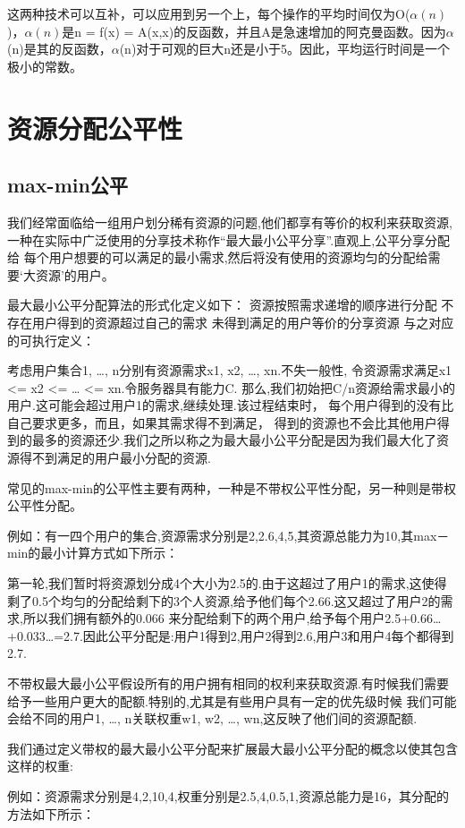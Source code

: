 这两种技术可以互补，可以应用到另一个上，每个操作的平均时间仅为O($\alpha(n)$)，$\alpha(n)$是n = f(x) = A(x,x)的反函数，并且A是急速增加的阿克曼函数。因为$\alpha$(n)是其的反函数，$\alpha$(n)对于可观的巨大n还是小于5。因此，平均运行时间是一个极小的常数。

\section{资源分配公平性}
\subsection{max-min公平}
我们经常面临给一组用户划分稀有资源的问题,他们都享有等价的权利来获取资源,
一种在实际中广泛使用的分享技术称作“最大最小公平分享”.直观上,公平分享分配给
每个用户想要的可以满足的最小需求,然后将没有使用的资源均匀的分配给需要‘大资源’的用户。

最大最小公平分配算法的形式化定义如下：
资源按照需求递增的顺序进行分配
不存在用户得到的资源超过自己的需求
未得到满足的用户等价的分享资源
与之对应的可执行定义：

考虑用户集合1, …, n分别有资源需求x1, x2, …, xn.不失一般性,
令资源需求满足x1 <= x2 <= … <= xn.令服务器具有能力C.
那么,我们初始把C/n资源给需求最小的用户.这可能会超过用户1的需求,继续处理.该过程结束时，
每个用户得到的没有比自己要求更多，而且，如果其需求得不到满足，
得到的资源也不会比其他用户得到的最多的资源还少.我们之所以称之为最大最小公平分配是因为我们最大化了资源得不到满足的用户最小分配的资源.

常见的max-min的公平性主要有两种，一种是不带权公平性分配，另一种则是带权公平性分配。

例如：有一四个用户的集合,资源需求分别是2,2.6,4,5,其资源总能力为10,其max－min的最小计算方式如下所示：

第一轮,我们暂时将资源划分成4个大小为2.5的.由于这超过了用户1的需求,这使得剩了0.5个均匀的分配给剩下的3个人资源,给予他们每个2.66.这又超过了用户2的需求,所以我们拥有额外的0.066
来分配给剩下的两个用户,给予每个用户2.5+0.66…+0.033…=2.7.因此公平分配是:用户1得到2,用户2得到2.6,用户3和用户4每个都得到2.7.

不带权最大最小公平假设所有的用户拥有相同的权利来获取资源.有时候我们需要给予一些用户更大的配额.特别的,尤其是有些用户具有一定的优先级时候
我们可能会给不同的用户1, …, n关联权重w1, w2, …, wn,这反映了他们间的资源配额.

我们通过定义带权的最大最小公平分配来扩展最大最小公平分配的概念以使其包含这样的权重:

例如：资源需求分别是4,2,10,4,权重分别是2.5,4,0.5,1,资源总能力是16，其分配的方法如下所示：

